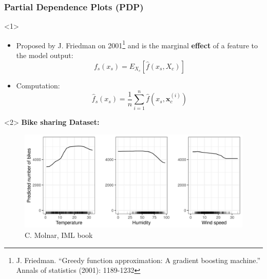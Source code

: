 \documentclass{beamer}
\newcommand{\Vx}{\mathbf{x}}
\newcommand{\obf}[1]{{\color{orange} \textbf{#1}}}
\begin{document}
\begin{frame}
  \frametitle{Partial Dependence Plots (PDP)}
  \begin{onlyenv}<1>
    \begin{itemize}
    \item Proposed by J. Friedman on 2001\footnote{J. Friedman. ``Greedy
    function approximation: A gradient boosting machine.'' Annals of statistics
    (2001): 1189-1232} and is the marginal \obf{effect} of a feature to the
      model output:
      \begin{equation*}
        f_s(x_s) = E_{X_c}\left[\hat{f}(x_s, X_c)\right]
      \end{equation*}
    \item Computation:
      \begin{equation*}
        \hat{f}_s(x_s) = \frac{1}{n}\sum\limits_{i=1}^{n}\hat{f}(x_s, \Vx_c^{(i)})
      \end{equation*}
    \end{itemize}
  \end{onlyenv}
  \begin{onlyenv}<2>
    \obf{Bike sharing Dataset:}
    \begin{figure}
      \includegraphics[width=\textwidth]{pdp-bike-1}
      \caption{\footnotesize C. Molnar, IML book}
    \end{figure}
  \end{onlyenv}
\end{frame}
\end{document}
